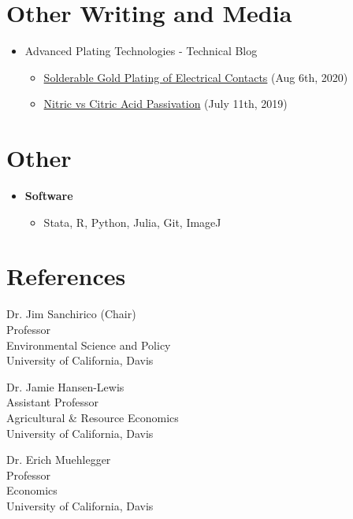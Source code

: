 \documentclass{article}[12]
\begin{document}
\section{Other Writing and Media}
\begin{itemize}
    \item Advanced Plating Technologies - Technical Blog
    \begin{itemize}
                \item \href{https://advancedplatingtech.com/blog/solderable-gold-plating-of-electrical-contacts/}{Solderable Gold Plating of Electrical Contacts} (Aug 6th, 2020)
    
                \item \href{https://advancedplatingtech.com/blog/nitric-vs-citric-acid-passivation/}{Nitric vs Citric Acid Passivation} (July 11th, 2019)
    \end{itemize}
\end{itemize}

\section{Other}
\begin{itemize}
    \item \textbf{Software}
    \begin{itemize}
        \item Stata, R, Python, Julia, Git, ImageJ
    \end{itemize}
\end{itemize}

\section{References}
\begin{minipage}[t]{.48\textwidth}
Dr. Jim Sanchirico (Chair)\\
Professor \\
Environmental Science and Policy \\
University of California, Davis \\
\end{minipage}
\hfill
\begin{minipage}[t]{.48\textwidth}
Dr. Jamie Hansen-Lewis \\
Assistant Professor \\
Agricultural \& Resource Economics \\
University of California, Davis \\
\end{minipage}

\vspace{1em}

\begin{minipage}[t]{.48\textwidth}
Dr. Erich Muehlegger\\
Professor \\
Economics \\
University of California, Davis \\
\end{minipage}




\thispagestyle{laststyle}
\end{document}

